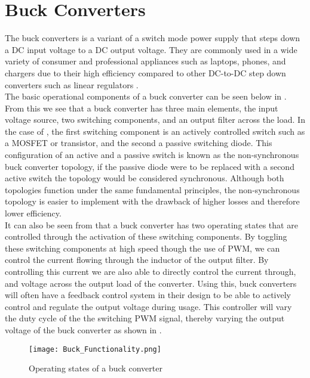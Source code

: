 \section{Buck Converters}\label{S:buck_back}

The buck converters is a variant of a switch mode power supply that steps down a DC input voltage to a DC output voltage. They are commonly used in a wide variety of consumer and professional appliances such as laptops, phones, and chargers due to their high efficiency compared to other DC-to-DC step down converters such as linear regulators \cite{Mohan2012}.\\

The basic operational components of a buck converter can be seen below in . From this we see that a buck converter has three main elements, the input voltage source, two switching components, and an output filter across the load. In the case of , the first switching component is an actively controlled switch such as a MOSFET or transistor, and the second a passive switching diode. This configuration of an active and a passive switch is known as the non-synchronous buck converter topology, if the passive diode were to be replaced with a second active switch the topology would be considered synchronous. Although both topologies function under the same fundamental principles, the non-synchronous topology is easier to implement with the drawback of higher losses and therefore lower efficiency.\\

It can also be seen from  that a buck converter has two operating states that are controlled through the activation of these switching components. By toggling these switching components at high speed though the use of PWM, we can control the current flowing through the inductor of the output filter. By controlling this current we are also able to directly control the current through, and voltage across the output load of the converter. Using this, buck converters will often have a feedback control system in their design to be able to actively control and regulate the output voltage during usage. This controller will vary the duty cycle of the the switching PWM signal, thereby varying the output voltage of the buck converter as shown in .\\

\begin{figure}[H]
	\texttt{[image: Buck\_Functionality.png]}
	\caption{Operating states of a buck converter}
	\label{F:buck_func}
\end{figure}


